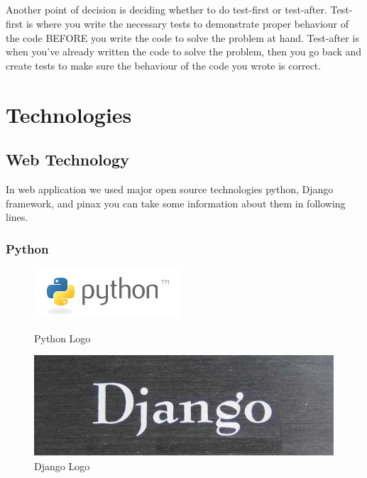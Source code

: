 \documentclass[12pt,a4paper,class,twoside,openany]{report}
\begin{document}
 \paragraph*{\hspace{.9 cm} } Another point of decision is deciding whether to do test-first or test-after. Test-first is where you write the necessary tests to demonstrate proper behaviour of the code BEFORE you write the code to solve the problem at hand. Test-after is when you've already written the code to solve the problem, then you go back and create tests to make sure the behaviour of the code you wrote is correct.
\cleardoublepage 
\chapter{Technologies}
\section{Web Technology}
 In web application we used major open source technologies python, Django framework, and pinax  you can  take some information about them in  following lines.
 \subsection{Python}
 
\begin{figure}
	\begin{minipage}[b]{0.5\linewidth}
	\centering
	\includegraphics[scale=.9]{3-1}
	\caption{Python Logo}
	\label{fg:3-1}
	\end{minipage}
	\hspace{0.5cm}
	\begin{minipage}[b]{0.5\linewidth}
	\centering
	\includegraphics[width=\textwidth]{3-2}
	\caption{Django Logo}
	\label{fg:3-2}
	\end{minipage}
	\end{figure}
\end{document}
